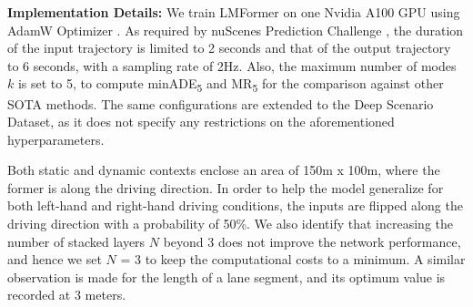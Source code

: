\noindent\textbf{Implementation Details:} We train LMFormer on one Nvidia A100 GPU using AdamW Optimizer \cite{loshchilov2018decoupled}. As required by nuScenes Prediction Challenge \cite{nuscene2020prediction}, the duration of the input trajectory is limited to 2 seconds and that of the output trajectory to 6 seconds, with a sampling rate of 2Hz.  Also, the maximum number of modes $k$ is set to 5, to compute minADE\textsubscript{5} and MR\textsubscript{5} for the comparison against other SOTA methods. The same configurations are extended to the Deep Scenario Dataset, as it does not specify any restrictions on the aforementioned hyperparameters. 

Both static and dynamic contexts enclose an area of 150m x 100m, where the former is along the driving direction. In order to help the model generalize for both left-hand and right-hand driving conditions, the inputs are flipped along the driving direction with a probability of 50\%. We also identify that increasing the number of stacked layers $N$ beyond 3 does not improve the network performance, and hence we set $N$ = 3 to keep the computational costs to a minimum. A similar observation is made for the length of a lane segment, and its optimum value is recorded at 3 meters. 

